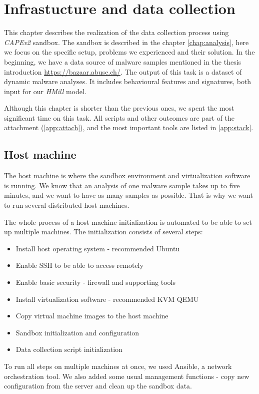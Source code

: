 \chapter{Infrastucture and data collection} \label{chap:infrastructure}
This chapter describes the realization of the data collection process using \emph{CAPEv2} sandbox. The sandbox is described in the chapter \ref{chap:analysis}, here we focus on the specific setup, problems we experienced and their solution. In the beginning, we have a data source of malware samples mentioned in the thesis introduction \url{https://bazaar.abuse.ch/}. The output of this task is a dataset of dynamic malware analyses. It includes behavioural features and signatures, both input for our \emph{HMill} model.

Although this chapter is shorter than the previous ones, we spent the most significant time on this task. All scripts and other outcomes are part of the attachment (\ref{app:attach}), and the most important tools are listed in \ref{app:stack}.

\section{Host machine}
The host machine is where the sandbox environment and virtualization software is running. We know that an analysis of one malware sample takes up to five minutes, and we want to have as many samples as possible. That is why we want to run several distributed host machines. 

The whole process of a host machine initialization is automated to be able to set up multiple machines. The initialization consists of several steps:
\begin{itemize}
    \item Install host operating system - recommended Ubuntu
    \item Enable SSH to be able to access remotely
    \item Enable basic security - firewall and supporting tools
    \item Install virtualization software - recommended KVM QEMU
    \item Copy virtual machine images to the host machine
    \item Sandbox initialization and configuration
    \item Data collection script initialization
\end{itemize}

To run all steps on multiple machines at once, we used Ansible, a network orchestration tool. We also added some usual management functions - copy new configuration from the server and clean up the sandbox data.

